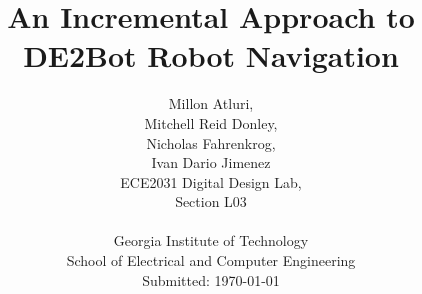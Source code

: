 \documentclass[12pt,conference,onecolumn]{article} %
\begin{document}
\title{\vspace*{30mm}
An Incremental Approach to DE2Bot Robot Navigation}

\author{
Millon Atluri,\\
Mitchell Reid Donley,\\
Nicholas Fahrenkrog,\\
Ivan Dario Jimenez
\vspace*{30mm}\\
ECE2031 Digital Design Lab,\\
Section L03\\
\vspace*{30mm}\\
Georgia Institute of Technology\\
School of Electrical and Computer Engineering\\
Submitted: \today
}

\maketitle
\clearpage
\end{document}

